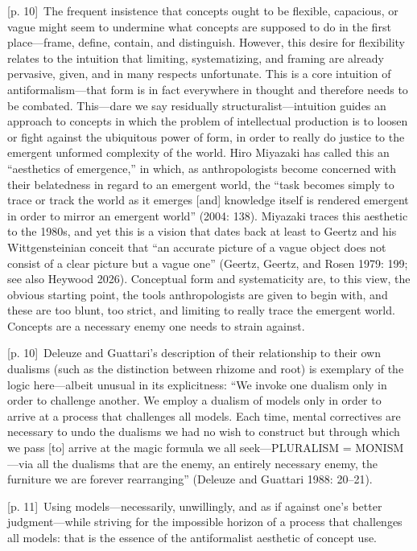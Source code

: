 \documentclass[10pt,a4paper]{article}
\begin{document}
{\scriptsize\color{gray} [p. 10]}\ The frequent insistence that concepts ought to be flexible, capacious, or vague might seem to undermine what concepts are supposed to do in the first place—frame, define, contain, and distinguish. However, this desire for flexibility relates to the intuition that limiting, systematizing, and framing are already pervasive, given, and in many respects unfortunate. This is a core intuition of antiformalism—that form is in fact everywhere in thought and therefore needs to be combated. This—dare we say residually structuralist—intuition guides an approach to concepts in which the problem of intellectual production is to loosen or fight against the ubiquitous power of form, in order to really do justice to the emergent unformed complexity of the world. Hiro Miyazaki has called this an “aesthetics of emergence,” in which, as anthropologists become concerned with their belatedness in regard to an emergent world, the “task becomes simply to trace or track the world as it emerges [and] knowledge itself is rendered emergent in order to mirror an emergent world” (2004: 138). Miyazaki traces this aesthetic to the 1980s, and yet this is a vision that dates back at least to Geertz and his Wittgensteinian conceit that “an accurate picture of a vague object does not consist of a clear picture but a vague one” (Geertz, Geertz, and Rosen 1979: 199; see also Heywood 2026). Conceptual form and systematicity are, to this view, the obvious starting point, the tools anthropologists are given to begin with, and these are too blunt, too strict, and limiting to really trace the emergent world. Concepts are a necessary enemy one needs to strain against.\par
{\scriptsize\color{gray} [p. 10]}\ Deleuze and Guattari’s description of their relationship to their own dualisms (such as the distinction between rhizome and root) is exemplary of the logic here—albeit unusual in its explicitness: “We invoke one dualism only in order to challenge another. We employ a dualism of models only in order to arrive at a process that challenges all models. Each time, mental correctives are necessary to undo the dualisms we had no wish to construct but through which we pass [to] arrive at the magic formula we all seek—PLURALISM = MONISM—via all the dualisms that are the enemy, an entirely necessary enemy, the furniture we are forever rearranging” (Deleuze and Guattari 1988: 20–21).\par
{\scriptsize\color{gray} [p. 11]}\ Using models—necessarily, unwillingly, and as if against one’s better judgment—while striving for the impossible horizon of a process that challenges all models: that is the essence of the antiformalist aesthetic of concept use.\par
\end{document}
